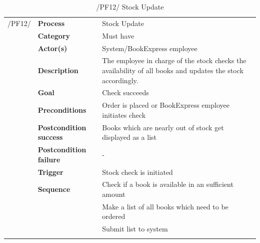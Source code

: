 \documentclass[11pt,a4paper,oneside,svgnames]{report}
\begin{document}
\begin{table}[H]
\centering
\begin{tabular}{p{1.5cm}p{3cm}p{8cm}}
\cellcolor{white}	 /PF12/	& \textbf{Process} & Stock Update\\ 
\cellcolor{white}		& \textbf{Category} & Must have\\
\cellcolor{white}		& \textbf{Actor(s)} & System/BookExpress employee\\ 
\cellcolor{white}		& \textbf{Description}	 & The employee in charge of the stock checks the availability of all books and updates the stock accordingly.\\ 
\cellcolor{white}		& \textbf{Goal} & Check succeeds\\
\cellcolor{white}		& \textbf{Preconditions} & Order is placed or BookExpress employee initiates check\\
\cellcolor{white}		& \textbf{Postcondition success} & Books which are nearly out of stock get displayed as a list\\
\cellcolor{white}		& \textbf{Postcondition failure} & -\\
\cellcolor{white}		& \textbf{Trigger} & Stock check is initiated\\
\cellcolor{white}		& \textbf{Sequence} & Check if a book is available in an sufficient amount\\
\cellcolor{white}		& & Make a list of all books which need to be ordered\\
\cellcolor{white}		& & Submit list to system\\
\cellcolor{white}\hfill \\
\end{tabular}
\caption{/PF12/ Stock Update}
\label{tab:pf12}
\end{table}
\end{document}

